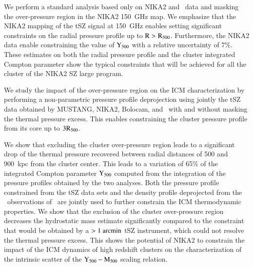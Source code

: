 \documentclass[traditabstract]{aa}
\begin{document}
We perform a standard analysis based only on NIKA2 and \planck\ data and masking the over-pressure region in the NIKA2 150~GHz map. We emphasize that the NIKA2 mapping of the tSZ signal at 150~GHz enables setting significant constraints on the radial pressure profile up to $\rm{R>R_{500}}$. Furthermore, the NIKA2 data enable constraining the value of $\rm{Y_{500}}$ with a relative uncertainty of 7\%. These estimates on both the radial pressure profile and the cluster integrated Compton parameter show the typical constraints that will be achieved for all the cluster of the NIKA2 SZ large program.

We study the impact of the over-pressure region on the ICM characterization by performing a non-parametric pressure profile deprojection using jointly the tSZ data obtained by MUSTANG, NIKA2, Bolocam, and \planck\ with and without masking the thermal pressure excess. This enables constraining the cluster pressure profile from its core up to $3\rm{R_{500}}$.

We show that excluding the cluster over-pressure region leads to a significant drop of the thermal pressure recovered between radial distances of 500 and 900~kpc from the cluster center. This leads to a variation of 65\% of the integrated Compton parameter $\rm{Y_{500}}$ computed from the integration of the pressure profiles obtained by the two analyses. Both the pressure profile constrained from the tSZ data sets and the density profile deprojected from the \xmm\ observations of \psz\ are jointly used to further constrain the ICM thermodynamic properties. We show that the exclusion of the cluster over-pressure region decreases the hydrostatic mass estimate significantly compared to the constraint that would be obtained by a $>1~\rm{arcmin}$ tSZ instrument, which could not resolve the thermal pressure excess. This shows the potential of NIKA2 to constrain the impact of the ICM dynamics of high redshift clusters on the characterization of the intrinsic scatter of the $\rm{Y_{500}} - \rm{M_{500}}$ scaling relation.\\
\end{document}
